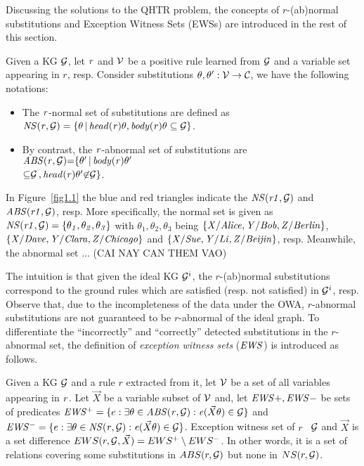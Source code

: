 Discussing the solutions to the QHTR problem, the concepts of $r$-(ab)normal substitutions and Exception Witness Sets (EWSs) are introduced in the rest of this section.

\begin{definition}\label{sec:rulelearn}
Given a KG $\mathcal{G}$, let $\mathit{r}$ and $\mathcal{V}$ be a positive rule learned from $\mathcal{G}$ and a variable set appearing in $r$, resp. Consider substitutions $\theta,\theta':\mathcal{V} \rightarrow \mathcal{C}$, we have the following notations:

\begin{itemize}
\item The $\mathit{r}$-normal set of substitutions are defined as $\mathit{NS(r, \mathcal{G})=\{\theta\, |\, head(r)\theta,body(r)\theta \subseteq \mathcal{G}\}}$.
\item By contrast, the $\mathit{r}$-abnormal set of substitutions are $\mathit{ABS(r, \mathcal{G}){=}\{\theta'\, |\, body(r)\theta'}$\\ $\mathit{{\subseteq} \mathcal{G}\,{,}\,head(r)\theta' {\not \in} \mathcal{G}\}}$.
\end{itemize}
\end{definition}

\begin{example}\label{ex:abns}
In Figure~\ref{fig1.1} the blue and red triangles indicate the $\mathit{NS(r1,\mathcal{G})}$ and $\mathit{ABS(r1,\mathcal{G})}$, resp. More specifically, the normal set is given as $\mathit{NS(r1,\mathcal{G})}=\{\mathit{\theta_1,\theta_2,\theta_3}\}$ with $\theta_1,\theta_2,\theta_3$ being $\{\mathit{X/Alice,Y/Bob,Z/Berlin}\}$, $\{\mathit{X/Dave,Y/Clara,Z/Chicago}\}$ and $\{\mathit{X/Sue,Y/Li,Z/Beijin}\}$, resp. Meanwhile, the abnormal set ... (CAI NAY CAN THEM VAO)
\end{example}

The intuition is that given the ideal KG $\mathcal{G}^i$, the $r$-(ab)normal substitutions correspond to the ground rules which are satisfied (resp. not satisfied) in $\mathcal{G}^i$, resp. Observe that, due to the incompleteness of the data under the OWA, $r$-abnormal substitutions are not guaranteed to be $r$-abnormal of the ideal graph. To differentiate the ``incorrectly'' and ``correctly'' detected substitutions in the $r$-abnormal set, the definition of \emph{exception witness sets} ($\mathit{EWS}$) is introduced as follows.

\begin{definition} \label{def:ews}
Given a KG $\mathcal{G}$ and a rule $r$ extracted from it, let $\mathcal{V}$ be a set of all variables appearing in $\mathit{r}$. Let $\vec{X}$ be a variable subset of $\mathcal{V}$ and, let $\mathit{EWS+, EWS-}$ be sets of predicates $\mathit{EWS^+}=\{e: \exists \theta \in \mathit{ABS(r,\mathcal{G})}: \mathit{e}(\vec{X}\theta)\in \mathcal{G}\}$ and $\mathit{EWS^-}=\{e: \exists \theta \in \mathit{NS(r,\mathcal{G})}: \mathit{e}(\vec{X}\theta)\in \mathcal{G}\}$. Exception witness set of $r$ \wrt\ $\mathcal{G}$ and $\vec{X}$ is a set difference $EWS(r,\mathcal{G},\vec{X})=EWS^+ \setminus EWS^-$. In other words, it is a set of relations covering some substitutions in $ABS(r, \mathcal{G})$ but none in $NS(r, \mathcal{G})$.
\end{definition}

